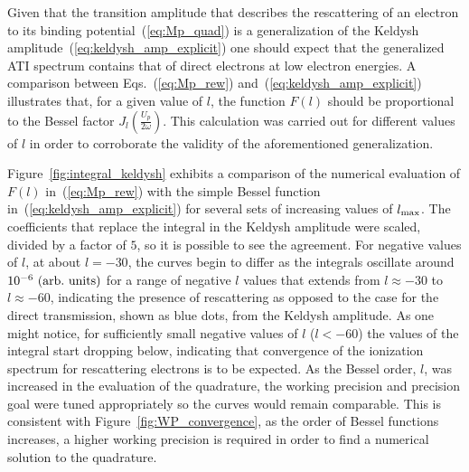 

Given that the transition amplitude that describes the rescattering of
an electron to its binding potential~(\ref{eq:Mp_quad}) is a
generalization of the Keldysh
amplitude~(\ref{eq:keldysh_amp_explicit}) one should expect that the
generalized ATI spectrum contains that of direct electrons at low
electron energies. A comparison between Eqs.~(\ref{eq:Mp_rew})
and~(\ref{eq:keldysh_amp_explicit}) illustrates that, for a given
value of $l$, the function $F(l)$ should be proportional to the Bessel
factor $J_{l}\left( \frac{U_{p}}{2\omega} \right)$. This calculation
was carried out for different values of $l$ in order to corroborate
the validity of the aforementioned generalization.

Figure~\ref{fig:integral_keldysh} exhibits a comparison of the
numerical evaluation of $F(l)$ in~(\ref{eq:Mp_rew}) with the simple
Bessel function in~(\ref{eq:keldysh_amp_explicit}) for several sets of
increasing values of $l_{\rm{max}}$. The coefficients that replace the
integral in the Keldysh amplitude were scaled, divided by a factor of
$5$, so it is possible to see the agreement. For negative values of
$l$, at about $l=-30$, the curves begin to differ as the integrals
oscillate around $10^{-6}\ \rm{(arb.\ units)}$ for a range of negative
$l$ values that extends from $l\approx -30$ to $l\approx -60$,
indicating the presence of rescattering as opposed to the case for the
direct transmission, shown as blue dots, from the Keldysh
amplitude. As one might notice, for sufficiently small negative values
of $l$ ($l < -60$) the values of the integral start dropping below,
indicating that convergence of the ionization spectrum for
rescattering electrons is to be expected. As the Bessel order, $l$,
was increased in the evaluation of the quadrature, the working
precision and precision goal were tuned appropriately so the curves
would remain comparable. This is consistent with
Figure~\ref{fig:WP_convergence}, as the order of Bessel functions
increases, a higher working precision is required in order to find a
numerical solution to the quadrature.


